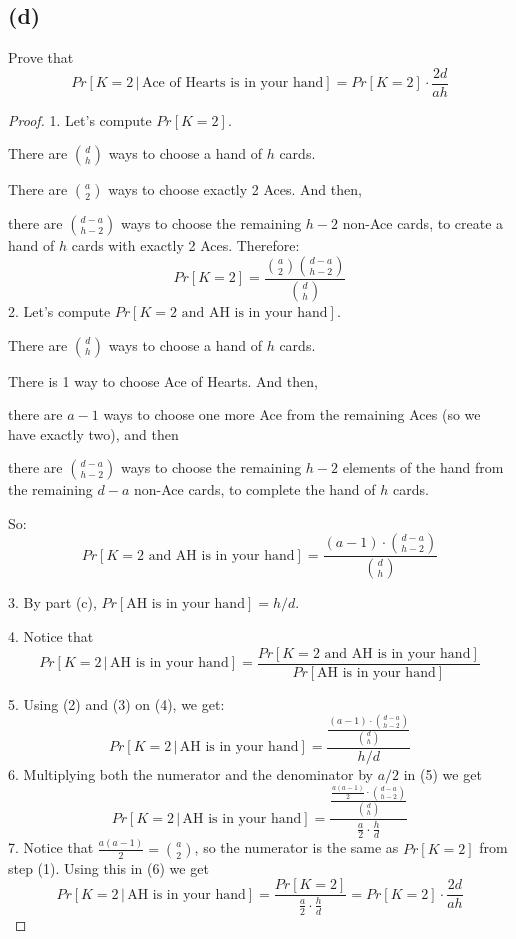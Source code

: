 \documentclass[14pt]{extarticle}
\begin{document}
\subsection{(d)}
Prove that
$$
Pr[K = 2 \,|\, \text{Ace of Hearts is in your hand}] = Pr[K = 2] \cdot \frac{2d}{ah}
$$
\begin{proof}
1. Let's compute $Pr[K=2]$. 

There are $\displaystyle\binom{d}{h}$ ways to choose a hand of $h$ cards. 

There are $\displaystyle\binom{a}{2}$ ways to choose exactly 2 Aces. And then,

there are $\displaystyle\binom{d-a}{h-2}$ ways to choose the remaining $h-2$ non-Ace cards, to create a hand of $h$ cards with exactly 2 Aces. Therefore:
$$
Pr[K=2] = \frac{\binom{a}{2}\binom{d-a}{h-2}}{\binom{d}{h}}
$$
2. Let's compute $Pr[K = 2 \text{ and AH is in your hand}]$.

There are $\displaystyle\binom{d}{h}$ ways to choose a hand of $h$ cards.

There is 1 way to choose Ace of Hearts. And then,

there are $a-1$ ways to choose one more Ace from the remaining Aces (so we have exactly two), and then

there are $\displaystyle\binom{d-a}{h-2}$ ways to choose the remaining $h-2$ elements of the hand from the remaining $d-a$ non-Ace cards, to complete the hand of $h$ cards.

So:
$$
Pr[K = 2 \text{ and AH is in your hand}] = \frac{(a-1) \cdot \binom{d-a}{h-2}}{\binom{d}{h}}
$$

3. By part (c), $Pr[\text{AH is in your hand}] = h/d$.

4. Notice that
$$
Pr[K = 2 \,|\, \text{AH is in your hand}] = \frac{Pr[K = 2 \text{ and AH is in your hand}]}{Pr[\text{AH is in your hand}]}
$$

5. Using (2) and (3) on (4), we get:
$$
Pr[K = 2 \,|\, \text{AH is in your hand}] = \frac{\displaystyle\frac{(a-1) \cdot \binom{d-a}{h-2}}{\binom{d}{h}}}{h/d}
$$
6. Multiplying both the numerator and the denominator by $a/2$ in (5) we get
$$
Pr[K = 2 \,|\, \text{AH is in your hand}] = \frac{\displaystyle\frac{\frac{a(a-1)}{2}\cdot \binom{d-a}{h-2}}{\binom{d}{h}}}{\frac{a}{2} \cdot \frac{h}{d}}
$$
7. Notice that $\frac{a(a-1)}{2} = \binom{a}{2}$, so the numerator is the same as $Pr[K=2]$ from step (1). Using this in (6) we get
$$
Pr[K = 2 \,|\, \text{AH is in your hand}] = \frac{Pr[K=2]}{\frac{a}{2} \cdot \frac{h}{d}} = Pr[K=2] \cdot \frac{2d}{ah}
$$
\end{proof}
\end{document}
